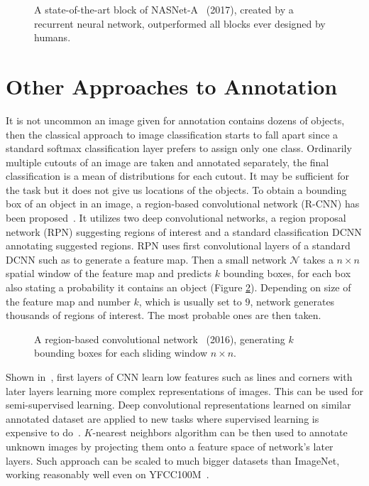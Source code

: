 \begin{figure}
	\centering
	
	
	\caption[A state-of-the-art block of NASNet-A]{A state-of-the-art block of NASNet-A~\cite{zoph2017learning} (2017), created by a recurrent neural network, outperformed all blocks ever designed by humans.}
	\label{fig:nasnet_block}
\end{figure}

\section*{Other Approaches to Annotation}

It is not uncommon an image given for annotation contains dozens of objects, then the classical approach to image classification starts to fall apart since a standard softmax classification layer prefers to assign only one class. Ordinarily multiple cutouts of an image are taken and annotated separately, the final classification is a mean of distributions for each cutout. It may be sufficient for the task but it does not give us locations of the objects. To obtain a bounding box of an object in an image, a region-based convolutional network (R-CNN) has been proposed~\cite{ren2015faster}. It utilizes two deep convolutional networks, a region proposal network (RPN) suggesting regions of interest and a standard classification DCNN annotating suggested regions. RPN uses first convolutional layers of a standard DCNN such as \cite{simonyan2014very} to generate a feature map. Then a small network $\mathcal{N}$ takes a $n\times n$ spatial window of the feature map and predicts $k$ bounding boxes, for each box also stating a probability it contains an object (Figure \ref{fig:faster_RCNN}). Depending on size of the feature map and number $k$, which is usually set to $9$, network generates thousands of regions of interest. The most probable ones are then taken.


\begin{figure}
	\centering
	
	
	\caption[A region-based convolutional network]{A region-based convolutional network~\cite{ren2015faster} (2016), generating $k$ bounding boxes for each sliding window $n\times n$.}
	\label{fig:faster_RCNN}
\end{figure}

Shown in~\cite{zeiler2014visualizing}, first layers of CNN learn low features such as lines and corners with later layers learning more complex representations of images. This can be used for semi-supervised learning. Deep convolutional representations learned on similar annotated dataset are applied to new tasks where supervised learning is expensive to do~\cite{donahue2014decaf}. $K$-nearest neighbors algorithm can be then used to annotate unknown images by projecting them onto a feature space of network's later layers. Such approach can be scaled to much bigger datasets than ImageNet, working reasonably well even on YFCC100M~\cite{amato2017searching}.